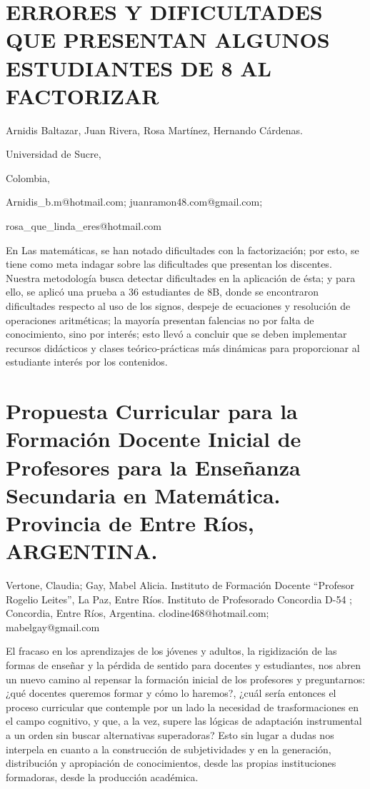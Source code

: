 \section{ERRORES Y DIFICULTADES QUE PRESENTAN ALGUNOS ESTUDIANTES DE 8\textdegree{}
AL FACTORIZAR}

\begin{datos}

Arnidis Baltazar, Juan Rivera, Rosa Martínez, Hernando Cárdenas.

Universidad de Sucre,

Colombia,

Arnidis\_b.m@hotmail.com; juanramon48.com@gmail.com;

rosa\_que\_linda\_eres@hotmail.com 

\end{datos}

En Las matemáticas, se han notado dificultades con la factorización;
por esto, se tiene como meta indagar sobre las dificultades que presentan
los discentes. Nuestra metodología busca detectar dificultades en
la aplicación de ésta; y para ello, se aplicó una prueba a 36 estudiantes
de 8\textdegree{}B, donde se encontraron dificultades respecto al
uso de los signos, despeje de ecuaciones y resolución de operaciones
aritméticas; la mayoría presentan falencias no por falta de conocimiento,
sino por interés; esto llevó a concluir que se deben implementar recursos
didácticos y clases teórico-prácticas más dinámicas para proporcionar
al estudiante interés por los contenidos. 


\section{Propuesta Curricular para la Formación Docente Inicial de Profesores
para la Enseñanza Secundaria en Matemática. Provincia de Entre Ríos,
ARGENTINA.}

\begin{datos}

Vertone, Claudia; Gay, Mabel Alicia. Instituto de Formación Docente
“Profesor Rogelio Leites”, La Paz, Entre Ríos. Instituto de Profesorado
Concordia D-54 ; Concordia, Entre Ríos, Argentina. clodine468@hotmail.com;
mabelgay@gmail.com 

\end{datos}

El fracaso en los aprendizajes de los jóvenes y adultos, la rigidización
de las formas de enseñar y la pérdida de sentido para docentes y estudiantes,
nos abren un nuevo camino al repensar la formación inicial de los
profesores y preguntarnos: ¿qué docentes queremos formar y cómo lo
haremos?, ¿cuál sería entonces el proceso curricular que contemple
por un lado la necesidad de trasformaciones en el campo cognitivo,
y que, a la vez, supere las lógicas de adaptación instrumental a un
orden sin buscar alternativas superadoras? Esto sin lugar a dudas
nos interpela en cuanto a la construcción de subjetividades y en la
generación, distribución y apropiación de conocimientos, desde las
propias instituciones formadoras, desde la producción académica.

